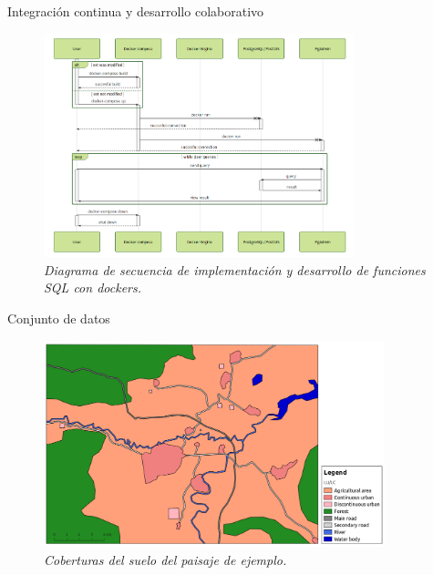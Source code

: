 \begin{frame}{Integración continua y desarrollo colaborativo}
\begin{figure}
\includegraphics[height=6.5cm]{Metodologia/Figs/ci}
\vspace{-0.5cm}
\caption{\textit{Diagrama de secuencia de implementación y desarrollo de funciones SQL con dockers.}}
\end{figure}
\end{frame}


\begin{frame}{Conjunto de datos}
\begin{figure}
\includegraphics[height=6cm]{Metodologia/Figs/zona_andrea}
\vspace{-0.5cm}
\caption{\textit{Coberturas del suelo del paisaje de ejemplo.}}
\end{figure}
\end{frame}



